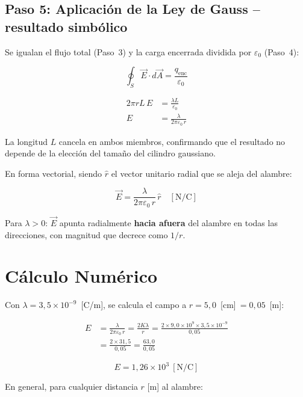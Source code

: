 \documentclass[12pt,letterpaper]{article}
\begin{document}
\bigskip

\subsection*{Paso 5: Aplicaci\'on de la Ley de Gauss -- resultado simb\'olico}

Se igualan el flujo total (Paso~3) y la carga encerrada dividida por $\varepsilon_0$ (Paso~4):

\[
    \oint_S \vec{E}\cdot d\vec{A} = \frac{q_\text{enc}}{\varepsilon_0}
\]

\begin{align*}
    2\pi r L\, E
        &= \frac{\lambda L}{\varepsilon_0} \\[8pt]
    E
        &= \frac{\lambda}{2\pi\varepsilon_0\, r}
\end{align*}

La longitud $L$ cancela en ambos miembros, confirmando que el resultado
no depende de la elecci\'on del tama\~no del cilindro gaussiano.

En forma vectorial, siendo $\hat{r}$ el vector unitario radial que se aleja del alambre:

\[
    \boxed{
        \vec{E} = \frac{\lambda}{2\pi\varepsilon_0\, r}\,\hat{r}
        \quad [\text{N/C}]
    }
\]

Para $\lambda > 0$: $\vec{E}$ apunta radialmente \textbf{hacia afuera} del alambre en todas
las direcciones, con magnitud que decrece como $1/r$.

\section*{C\'alculo Num\'erico}

Con $\lambda = 3{,}5 \times 10^{-9}$~[C/m], se calcula el campo a $r = 5{,}0$~[cm]$\ = 0{,}05$~[m]:

\begin{align*}
    E &= \frac{\lambda}{2\pi\varepsilon_0\, r}
       = \frac{2K\lambda}{r}
       = \frac{2 \times 9{,}0\times10^{9} \times 3{,}5\times10^{-9}}{0{,}05} \\[8pt]
      &= \frac{2 \times 31{,}5}{0{,}05}
       = \frac{63{,}0}{0{,}05}
\end{align*}

\[
    \boxed{E = 1{,}26 \times 10^{3}\ [\text{N/C}]}
\]

En general, para cualquier distancia $r$ [m] al alambre:
\end{document}
